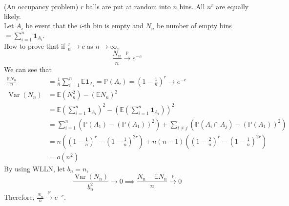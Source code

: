 \documentclass{huhtakm-template-book}
\newcommand{\prob}{\mathbb{P}}
\newcommand{\expect}{\mathbb{E}}
\DeclareMathOperator{\Var}{Var}
\begin{document}
\begin{eg}(An occupancy problem)
	$r$ balls are put at random into $n$ bins. All $n^{r}$ are equally likely.\\
	Let $A_{i}$ be event that the $i$-th bin is empty and $N_{n}$ be number of empty bins $=\sum_{i=1}^{n}\mathbf{1}_{A_{i}}$.\\
	How to prove that if $\frac{r}{n}\to c$ as $n\to\infty$,
	\begin{equation*}
		\frac{N_{n}}{n}\xrightarrow{\prob}e^{-c}
	\end{equation*}
	We can see that
	\begin{align*}
		\frac{\expect N_{n}}{n}&=\frac{1}{n}\sum_{i=1}^{n}\expect\mathbf{1}_{A_{i}}=\prob(A_{i})=\left(1-\frac{1}{n}\right)^{r}\to e^{-c}\\
		\Var(N_{n})&=\expect(N_{n}^{2})-(\expect N_{n})^{2}\\
		&=\expect\left(\sum_{i=1}^{n}\mathbf{1}_{A_{i}}\right)^{2}-\left(\expect\left(\sum_{i=1}^{n}\mathbf{1}_{A_{i}}\right)\right)^{2}\\
		&=\sum_{i=1}^{n}(\prob(A_{1})-(\prob(A_{1}))^{2})+\sum_{i\neq j}(\prob(A_{i}\cap A_{j})-(\prob(A_{1}))^{2})\\
		&=n\left(\left(1-\frac{1}{n}\right)^{r}-\left(1-\frac{1}{n}\right)^{2r}\right)+n(n-1)\left(\left(1-\frac{2}{n}\right)^{r}-\left(1-\frac{1}{n}\right)^{2r}\right)\\
		&=o(n^{2})
	\end{align*}
	By using WLLN, let $b_{n}=n$,
	\begin{equation*}
		\frac{\Var(N_{n})}{b_{n}^{2}}\to 0\implies\frac{N_{n}-\expect N_{n}}{n}\xrightarrow{\prob}0
	\end{equation*}
	Therefore, $\frac{N_{n}}{n}\xrightarrow{\prob}e^{-c}$.
\end{eg}

\newpage
\end{document}
